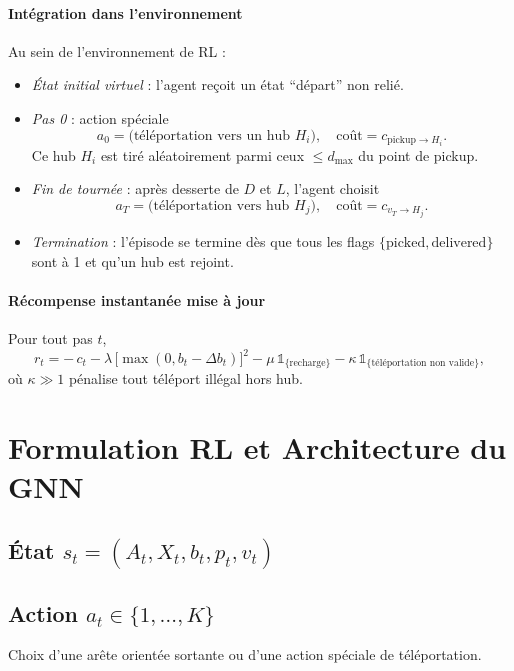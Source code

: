 \documentclass[11pt,a4paper]{article}
\begin{document}
\paragraph{Intégration dans l'environnement}  
Au sein de l'environnement de RL :
\begin{itemize}
  \item \emph{État initial virtuel} : l’agent reçoit un état “départ” non relié.
  \item \emph{Pas 0} : action spéciale 
    \[
      a_0 = \bigl(\text{téléportation vers un hub }H_i\bigr),
      \quad \text{coût}=c_{\text{pickup}\to H_i}.
    \]
    Ce hub \(H_i\) est tiré aléatoirement parmi ceux \(\le d_{\max}\) du point de pickup.
  \item \emph{Fin de tournée} : après desserte de \(D\) et \(L\), l’agent choisit
    \[
      a_T = \bigl(\text{téléportation vers hub }H_j\bigr),
      \quad \text{coût}=c_{v_T\to H_j}.
    \]
  \item \emph{Termination} : l’épisode se termine dès que tous les flags \(\{\text{picked},\text{delivered}\}\) sont à 1 et qu’un hub est rejoint.
\end{itemize}

\paragraph{Récompense instantanée mise à jour}
Pour tout pas \(t\),
\[
  r_t 
  = -\,c_t
    - \lambda\,\bigl[\max(0,b_t - \Delta b_t)\bigr]^2
    - \mu\,\mathbb1_{\{\text{recharge}\}}
    - \kappa\,\mathbb1_{\{\text{téléportation non valide}\}},
\]
où \(\kappa\gg1\) pénalise tout téléport illégal hors hub.

\section{Formulation RL et Architecture du GNN}
\subsection{État \texorpdfstring{\(\displaystyle s_t=(A_t,X_t,b_t,p_t,v_t)\)}{s_t=(A_t,X_t,b_t,p_t,v_t)}}

\subsection{Action \texorpdfstring{\(\displaystyle a_t\in\{1,\dots,K\}\)}{a_t in {1,...,K}}}  
Choix d’une arête orientée sortante ou d’une action spéciale de téléportation.
\end{document}
